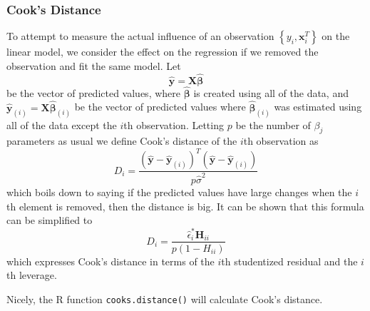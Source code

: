 \documentclass[]{book}
\newenvironment{Shaded}{\begin{snugshade}}{\end{snugshade}}
\newcommand{\KeywordTok}[1]{\textcolor[rgb]{0.13,0.29,0.53}{\textbf{{#1}}}}
\newcommand{\DataTypeTok}[1]{\textcolor[rgb]{0.13,0.29,0.53}{{#1}}}
\newcommand{\StringTok}[1]{\textcolor[rgb]{0.31,0.60,0.02}{{#1}}}
\newcommand{\CommentTok}[1]{\textcolor[rgb]{0.56,0.35,0.01}{\textit{{#1}}}}
\newcommand{\NormalTok}[1]{{#1}}
\theoremstyle{definition}
\theoremstyle{definition}
\theoremstyle{remark}
\begin{document}
\subsubsection{Cook's Distance}\label{cooks-distance}

To attempt to measure the actual influence of an observation
\(\left\{ y_{i},\boldsymbol{x}_{i}^{T}\right\}\) on the linear model, we
consider the effect on the regression if we removed the observation and
fit the same model. Let
\[\hat{\boldsymbol{y}}=\boldsymbol{X}\hat{\boldsymbol{\beta}}\] be the
vector of predicted values, where \(\hat{\boldsymbol{\beta}}\) is
created using all of the data, and
\(\hat{\boldsymbol{y}}_{(i)}=\boldsymbol{X}\hat{\boldsymbol{\beta}}_{(i)}\)
be the vector of predicted values where
\(\hat{\boldsymbol{\beta}}_{(i)}\) was estimated using all of the data
except the \(i\)th observation. Letting \(p\) be the number of
\(\beta_{j}\) parameters as usual we define Cook's distance of the
\(i\)th observation as
\[ D_{i} = \frac{\left(\hat{\boldsymbol{y}}-\hat{\boldsymbol{y}}_{(i)}\right)^{T}\left(\hat{\boldsymbol{y}}-\hat{\boldsymbol{y}}_{(i)}\right)}{p\hat{\sigma}^{2}}\]
which boils down to saying if the predicted values have large changes
when the \(i\)th element is removed, then the distance is big. It can be
shown that this formula can be simplified to
\[D_{i}=\frac{\hat{\epsilon}_{i}^{*}\boldsymbol{H}_{ii}}{p\left(1-H_{ii}\right)}\]
which expresses Cook's distance in terms of the \(i\)th studentized
residual and the \(i\)th leverage.

Nicely, the R function \texttt{cooks.distance()} will calculate Cook's
distance.

\begin{Shaded}
\end{Shaded}
\end{document}
